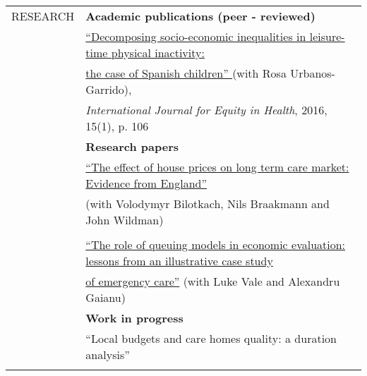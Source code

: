 \documentclass[letterpaper,11pt,oneside]{article}
\begin{document}
\begin{tabular}{@{} l l}
   
 \normalsize{RESEARCH }    & \textbf{Academic publications (peer - reviewed)} \\
    & \href{https://equityhealthj.biomedcentral.com/articles/10.1186/s12939-016-0394-9}{``Decomposing socio-economic inequalities in leisure-time physical inactivity:} \\
    & \href{https://equityhealthj.biomedcentral.com/articles/10.1186/s12939-016-0394-9}{the case of Spanish children'' }(with Rosa Urbanos-Garrido), \\
    &\textit{International Journal for Equity in Health}, 2016, 15(1), p. 106
  
      &\\
     & \textbf{Research papers} \\
     & \href{https://mpra.ub.uni-muenchen.de/81987/1/MPRA_paper_81987.pdf}{``The effect of house prices on long term care market: Evidence from England''} \\
   & (with Volodymyr Bilotkach, Nils Braakmann and John Wildman)\\
    &\\

   & \href{https://research.ncl.ac.uk/media/sites/researchwebsites/healtheconomicsgroup/HEG2015_03.pdf}{``The role of queuing models in economic evaluation: lessons from an illustrative case study}
    \\
   &\href{https://research.ncl.ac.uk/media/sites/researchwebsites/healtheconomicsgroup/HEG2015_03.pdf}{of emergency care''} (with Luke Vale and Alexandru Gaianu)}
    & \\
   & \textbf{Work in progress} \\
        & ``Local budgets and care homes quality: a duration analysis'' \\
      &\\
  \end{tabular}
\newpage
\end{document}
